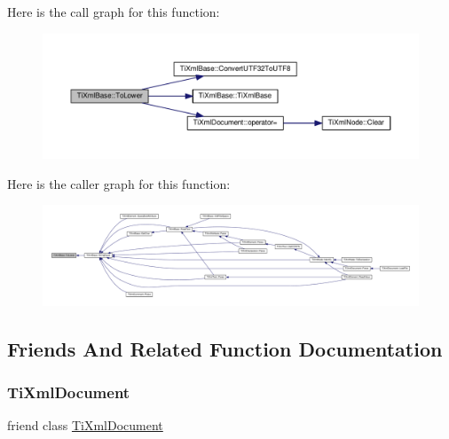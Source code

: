 Here is the call graph for this function\+:\nopagebreak
\begin{figure}[H]
\begin{center}
\leavevmode
\includegraphics[width=350pt]{class_ti_xml_base_a799f17405a86a5c2029618e85f11a097_cgraph}
\end{center}
\end{figure}
Here is the caller graph for this function\+:\nopagebreak
\begin{figure}[H]
\begin{center}
\leavevmode
\includegraphics[width=350pt]{class_ti_xml_base_a799f17405a86a5c2029618e85f11a097_icgraph}
\end{center}
\end{figure}


\subsection{Friends And Related Function Documentation}
\mbox{\label{class_ti_xml_base_a173617f6dfe902cf484ce5552b950475}} 
\subsubsection{\texorpdfstring{Ti\+Xml\+Document}{TiXmlDocument}}
{\footnotesize\ttfamily friend class \hyperlink{class_ti_xml_document}{Ti\+Xml\+Document}\hspace{0.3cm}{\ttfamily [friend]}}

\mbox{\label{class_ti_xml_base_ab6592e32cb9132be517cc12a70564c4b}} 
